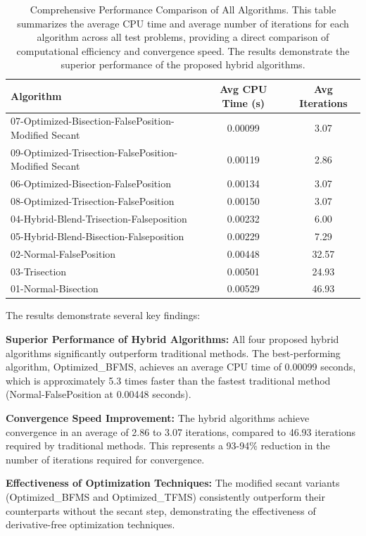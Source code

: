 \documentclass[amsmath, amssymb, aps]{revtex4-2}
\begin{document}
\begin{table}[H]
\centering
\caption{Comprehensive Performance Comparison of All Algorithms. This table summarizes the average CPU time and average number of iterations for each algorithm across all test problems, providing a direct comparison of computational efficiency and convergence speed. The results demonstrate the superior performance of the proposed hybrid algorithms.}
\label{tab:performance_comparison}
\begin{tabular}{lcc}
\toprule
Algorithm & Avg CPU Time (s) & Avg Iterations \\
\midrule
07-Optimized-Bisection-FalsePosition-Modified Secant & 0.00099 & 3.07 \\
09-Optimized-Trisection-FalsePosition-Modified Secant & 0.00119 & 2.86 \\
06-Optimized-Bisection-FalsePosition & 0.00134 & 3.07 \\
08-Optimized-Trisection-FalsePosition & 0.00150 & 3.07 \\
04-Hybrid-Blend-Trisection-Falseposition & 0.00232 & 6.00 \\
05-Hybrid-Blend-Bisection-Falseposition & 0.00229 & 7.29 \\
02-Normal-FalsePosition & 0.00448 & 32.57 \\
03-Trisection & 0.00501 & 24.93 \\
01-Normal-Bisection & 0.00529 & 46.93 \\
\bottomrule
\end{tabular}
\end{table}

The results demonstrate several key findings:

\textbf{Superior Performance of Hybrid Algorithms:} All four proposed hybrid algorithms significantly outperform traditional methods. The best-performing algorithm, Optimized\_BFMS, achieves an average CPU time of 0.00099 seconds, which is approximately 5.3 times faster than the fastest traditional method (Normal-FalsePosition at 0.00448 seconds).

\textbf{Convergence Speed Improvement:} The hybrid algorithms achieve convergence in an average of 2.86 to 3.07 iterations, compared to 46.93 iterations required by traditional methods. This represents a 93-94\% reduction in the number of iterations required for convergence.

\textbf{Effectiveness of Optimization Techniques:} The modified secant variants (Optimized\_BFMS and Optimized\_TFMS) consistently outperform their counterparts without the secant step, demonstrating the effectiveness of derivative-free optimization techniques.
\end{document}
